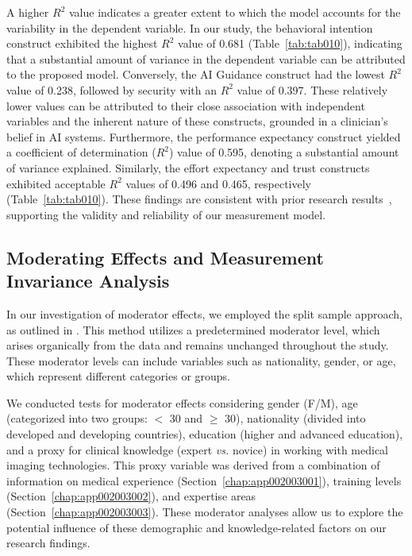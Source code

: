A higher $R^2$ value indicates a greater extent to which the model accounts for the variability in the dependent variable.
In our study, the behavioral intention construct exhibited the highest $R^2$ value of 0.681 (Table~\ref{tab:tab010}), indicating that a substantial amount of variance in the dependent variable can be attributed to the proposed model.
Conversely, the \ac{AI} Guidance construct had the lowest $R^2$ value of 0.238, followed by security with an $R^2$ value of 0.397. These relatively lower values can be attributed to their close association with independent variables and the inherent nature of these constructs, grounded in a clinician's belief in \ac{AI} systems.
Furthermore, the performance expectancy construct yielded a coefficient of determination ($R^2$) value of 0.595, denoting a substantial amount of variance explained.
Similarly, the effort expectancy and trust constructs exhibited acceptable $R^2$ values of 0.496 and 0.465, respectively (Table~\ref{tab:tab010}).
These findings are consistent with prior research results~\cite{KHALILZADEH2017460}, supporting the validity and reliability of our measurement model.

\subsection{Moderating Effects and Measurement Invariance Analysis}
\label{chap:app002004005}

\textcolor{revised}{In our investigation of moderator effects, we employed the split sample approach, as outlined in \cite{LI2021106581, LI2021106929}.
This method utilizes a predetermined moderator level, which arises organically from the data and remains unchanged throughout the study.
These moderator levels can include variables such as nationality, gender, or age, which represent different categories or groups.}

\textcolor{revised}{We conducted tests for moderator effects considering gender (F/M), age (categorized into two groups: $<$ 30 and $\geq$ 30), nationality (divided into developed and developing countries), education (higher and advanced education), and a proxy for clinical knowledge (expert {\it vs.} novice) in working with medical imaging technologies.
This proxy variable was derived from a combination of information on medical experience (Section~\ref{chap:app002003001}), training levels (Section~\ref{chap:app002003002}), and expertise areas (Section~\ref{chap:app002003003}).
These moderator analyses allow us to explore the potential influence of these demographic and knowledge-related factors on our research findings.}

